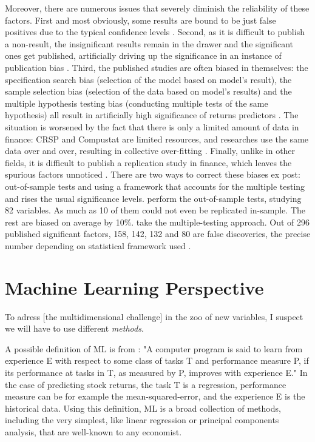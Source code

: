		Moreover, there are numerous issues that severely diminish the reliability of these factors. First and most obviously, some results are bound to be just false positives due to the typical confidence levels \citep{harvey2016and}. Second, as it is difficult to publish a non-result, the insignificant results remain in the drawer and the significant ones get published, artificially driving up the significance in an instance of publication bias \citep{harvey2016and}. Third, the published studies are often biased in themselves: the specification search bias (selection of the model based on model's result), the sample selection bias (selection of the data based on model's results) and the multiple hypothesis testing bias (conducting multiple tests of the same hypothesis) all result in artificially high significance of returns predictors \citep{mclean2016does}. The situation is worsened by the fact that there is only a limited amount of data in finance: CRSP and Compustat are limited resources, and researches use the same data over and over, resulting in collective over-fitting \citep{harvey2016and}. Finally, unlike in other fields, it is difficult to publish a replication study in finance, which leaves the spurious factors unnoticed \citep{harvey2016and}. There are two ways to correct these biases ex post: out-of-sample tests  and using a framework that accounts for the multiple testing and rises the usual significance levels. \cite{mclean2016does} perform the out-of-sample tests, studying 82 variables. As much as 10 of them could not even be replicated in-sample. The rest are biased on average by 10\%. \cite{harvey2016and} take the multiple-testing approach. Out of 296 published significant factors, 158, 142, 132 and 80 are false discoveries, the precise number depending on statistical framework used \cite{harvey2016and}. 
		
		
	
	\section{Machine Learning Perspective}
	
		\epigraph{To adress [the multidimensional challenge] in the zoo of new variables, I suspect we will have to use different \textit{methods}.}{\cite{cochrane2011presidential}}
		
		A possible definition of ML is from  \cite[p.~2]{mitchell1997machine}: "A computer  program is  said to learn from experience E with respect to  some class of tasks T and performance  measure P, if  its performance at  tasks in T, as measured by P, improves with experience E." In the case of predicting stock returns, the task T is a regression, performance measure can be for example the mean-squared-error, and the experience E is the historical data. Using this definition, ML is a broad collection of methods, including the very simplest, like linear regression or principal components analysis, that are well-known to any economist.  
		
